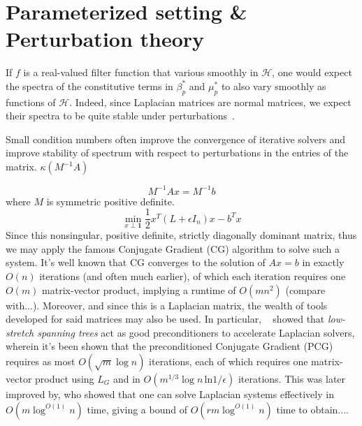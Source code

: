 \documentclass[10pt]{article}
\numberwithin{equation}{section}
\newcommand{\+}{%
	\raisebox{0.18ex}{\scaleobj{0.55}{+}}
}
\theoremstyle{definition}
\theoremstyle{definition}
\begin{document}
\section{Parameterized setting \& Perturbation theory}
If $f$ is a real-valued filter function that various smoothly in $\mathcal{H}$, one would expect the spectra of the constitutive terms in $\beta_p^\ast$ and $\mu_p^\ast$ to also vary smoothly as functions of $\mathcal{H}$.
Indeed, since Laplacian matrices are normal matrices, we expect their spectra to be quite stable under perturbations~\cite{}. 


Small condition numbers often improve the convergence of iterative solvers and improve stability of spectrum with respect to perturbations in the entries of the matrix. 
$\kappa(M^{-1} A)$

$$
M^{-1} A x = M^{-1}b 
$$
where $M$ is symmetric positive definite. 
\begin{equation}
	\min_{x \perp \mathbf{1} } \frac{1}{2} x^T (L + \epsilon I_n) x - b^T x
\end{equation}
Since this nonsingular, positive definite, strictly diagonally dominant matrix, thus we may apply the famous Conjugate Gradient (CG) algorithm to solve such a system. It's well known that CG converges to the solution of $A x = b$ in exactly $O(n)$ iterations (and often much earlier), of which each iteration requires one $O(m)$ matrix-vector product, implying a runtime of $O(mn^2)$ (compare with...).  
Moreover, and since this is a Laplacian matrix, the wealth of tools developed for said matrices may also be used.
In particular, ~\cite{} showed that \emph{low-stretch spanning trees} act as good preconditioners to accelerate Laplacian solvers, wherein it's been shown that the preconditioned Conjugate Gradient (PCG) requires as most $O(\sqrt{m} \log n)$ iterations, each of which requires one matrix-vector product using $L_G$ and in $O(m^{1/3} \log n \, \mathrm{ln} 1/\epsilon)$ iterations. 
This was later improved by, who showed that one can solve Laplacian systems effectively in $O(m \log^{O(1)} n)$ time, giving a bound of $O(r m \log^{O(1)} n)$ time to obtain.... 
\end{document}
